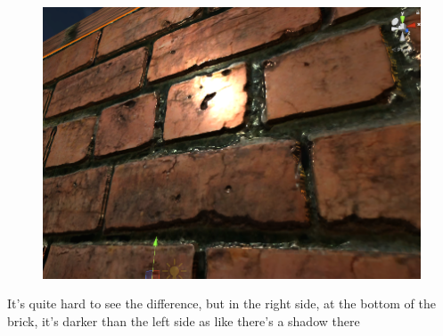 \documentclass[a4paper, 13pt]{extarticle}
\begin{document}
{\begin{figure}[h]
\begin{minipage}{.45\textwidth}
		\includegraphics[width=0.9\linewidth]{intructions/with_occlusion.png}
		\centering
		\label{fig:test25}
	\end{minipage}
 
\end{figure}
It's quite hard to see the difference, but in the right side, at the bottom of the brick, it's darker than the left side as like there's a shadow there

}
\end{document}
